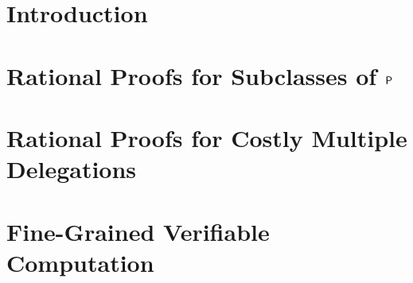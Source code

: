 \documentclass[justified,nobib]{tufte-book}
\begin{document}
	



% 


\pagestyle{fancy}

\chapter{Introduction}


%

\chapter{Rational Proofs for Subclasses of $\P$}


\chapter{Rational Proofs for Costly Multiple Delegations}


\chapter{Fine-Grained Verifiable Computation}


%
%



\printbibliography
\end{document}
